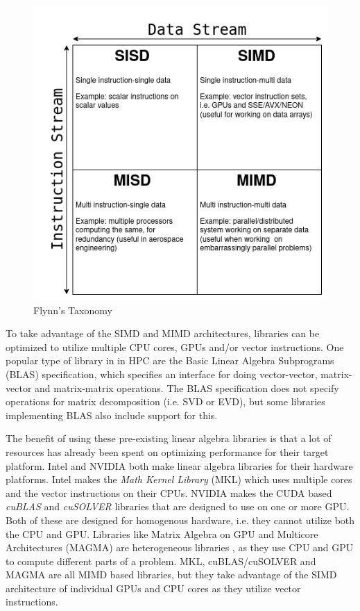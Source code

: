 \begin{figure}[H]
    \centering
    \includegraphics[scale=0.45]{Figures/flynns_taxonomy.png}
    \caption{Flynn's Taxonomy}
    \label{fig:flynn:taxonomy}
\end{figure}

To take advantage of the SIMD and MIMD architectures, libraries can be optimized to utilize multiple CPU cores, GPUs and/or vector instructions. One popular type of library in in HPC are the Basic Linear Algebra Subprograms (BLAS) specification, which specifies an interface for doing vector-vector, matrix-vector and matrix-matrix operations. The BLAS specification does not specify operations for matrix decomposition (i.e. SVD or EVD), but some libraries implementing BLAS also include support for this.

The benefit of using these pre-existing linear algebra libraries is that a lot of resources has already been spent on optimizing performance for their target platform. Intel and NVIDIA both make linear algebra libraries for their hardware platforms. Intel makes the \textit{Math Kernel Library} (MKL) \cite{intel:mkl} which uses multiple cores and the vector instructions on their CPUs. NVIDIA makes the CUDA based \textit{cuBLAS} and \textit{cuSOLVER} libraries \cite{nvidia:cuda} that are designed to use on one or more GPU. Both of these are designed for homogenous hardware, i.e. they cannot utilize both the CPU and GPU. Libraries like Matrix Algebra on GPU and Multicore Architectures (MAGMA) are heterogeneous libraries \cite{tomov:magma}, as they use CPU and GPU to compute different parts of a problem. MKL, cuBLAS/cuSOLVER and MAGMA are all MIMD based libraries, but they take advantage of the SIMD architecture of individual GPUs and CPU cores as they utilize vector instructions.

